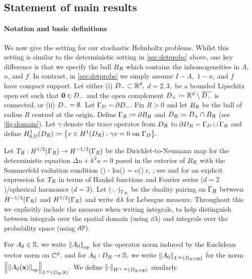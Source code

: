\subsection{Statement of main results}\label{sec:hh-results}

\paragraph{Notation and basic definitions} We now give the setting for our stochastic Helmholtz problems. Whilst this setting is similar to the deterministic setting in \cref{sec:detprobs} above, one key difference is that we specify the ball $B_{R}$ which contains the inhomogeneities in $A$, $n$, and $f$. In contrast, in \cref{sec:detprobs} we simply assume $I-A,$ $1-n$, and $f$ have compact support. Let either (i) $D_{-} \subset \mathbb R^{d},$ $d=2,3,$ be a bounded Lipschitz open set such that $\mathbf{0} \in D_{-}$ and the open complement $D_{+}\coloneqq \mathbb R^d\setminus \overline{D_{-}}$ is connected, or (ii) $D_{-} = \emptyset.$ Let $\Gamma_{D} = \partial D_{-}.$ 
Fix $R>0$ and let $B_{R}$ be the ball of radius $R$ centred at the origin. Define $\Gamma_{R} := \partial B_{R}$ and $D_{R} \coloneqq D_{+} \cap B_{R}$ (see \cref{fig:domain}). Let $\gamma$ denote the trace operator from $D_{R}$ to $\partial D_{R} = \Gamma_{D} \cup \Gamma_{R}$ and define $\HozDDR \de \set{v \in \HoDR \st \gamma v = 0 \ton \GD}.$ 
 
Let $T_{R}: H^{1/2}(\Gamma_R) \rightarrow H^{-1/2}(\Gamma_R)$ be the Dirichlet-to-Neumann map for the deterministic equation $\Delta u+k^2 u=0$ posed in the exterior of $B_{R}$ with the Sommerfeld radiation condition 
\beq\label{eq:src}
(\bx) - \ri ku(\bx) = o\mleft(\mright)  r\de\abs{\bx}\rightarrow \infty,  \frac{\bx}{\abs{\bx}};
\eeq
see \cite[Section 2.6.3]{Ne:01} and \cite[Equations 3.5 and 3.6]{ChMo:08} for an explicit expression for $T_{R}$  in terms of Hankel functions and Fourier series ($d=2$)/spherical harmonics ($d=3$). Let $\IPGR{\cdot}{\cdot}$ be the duality pairing on $\Gamma_{R}$ between $\HmhGR$ and $\HhGR$ and write $\mathrm{d}\lambda$ for Lebesgue measure. Throughout this  we explicitly include the measure when writing integrals, to help distinguish between integrals over the spatial domain (using $\dd\lambda$) and integrals over the probability space (using $\mathrm{d}\mathbb P).$

For $A_{0} \in \mathbb S,$ we write $\NopCCd{\Az}$ for the operator norm induced by the Euclidean vector norm on $\mathbb C^{d}$, and for $A_{0}:D_{R} \rightarrow \mathbb S,$ we write $\NLiDRRRdtd{\Az}$ for the norm $\NLiDRRR{\Nop{\Az(\bx)}}.$ We define $\NWoiDRRRdtd{\cdot}$ similarly.

